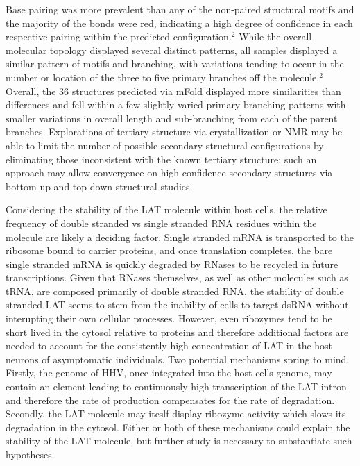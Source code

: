 \documentclass[letterpaper, 10 pt, conference]{ieeeconf}  %
\begin{document}
Base pairing was more prevalent than any of the non-paired structural motifs and the majority of the bonds were red, indicating a high degree of confidence in each respective pairing within the predicted configuration.$^2$ While the overall molecular topology displayed several distinct patterns, all samples displayed a similar pattern of motifs and branching, with variations tending to occur in the number or location of the three to five primary branches off the molecule.$^2$ Overall, the 36 structures predicted via mFold displayed more similarities than differences and fell within a few slightly varied primary branching patterns with smaller variations in overall length and sub-branching from each of the parent branches. Explorations of tertiary structure via crystallization or NMR may be able to limit the number of possible secondary structural configurations by eliminating those inconsistent with the known tertiary structure; such an approach may allow convergence on high confidence secondary structures via bottom up and top down structural studies.

Considering the stability of the LAT molecule within host cells, the relative frequency of double stranded vs single stranded RNA residues within the molecule are likely a deciding factor. Single stranded mRNA is transported to the ribosome bound to carrier proteins, and once translation completes, the bare single stranded mRNA is quickly degraded by RNases to be recycled in future transcriptions. Given that RNases themselves, as well as other molecules such as tRNA, are composed primarily of double stranded RNA, the stability of double stranded LAT seems to stem from the inability of cells to target dsRNA without interupting their own cellular processes. However, even ribozymes tend to be short lived in the cytosol relative to proteins and therefore additional factors are needed to account for the consistently high concentration of LAT in the host neurons of asymptomatic individuals. Two potential mechanisms spring to mind. Firstly, the genome of HHV, once integrated into the host cells genome, may contain an element leading to continuously high transcription of the LAT intron and therefore the rate of production compensates for the rate of degradation. Secondly, the LAT molecule may iteslf display ribozyme activity which slows its degradation in the cytosol. Either or both of these mechanisms could explain the stability of the LAT molecule, but further study is necessary to substantiate such hypotheses.
\end{document}
